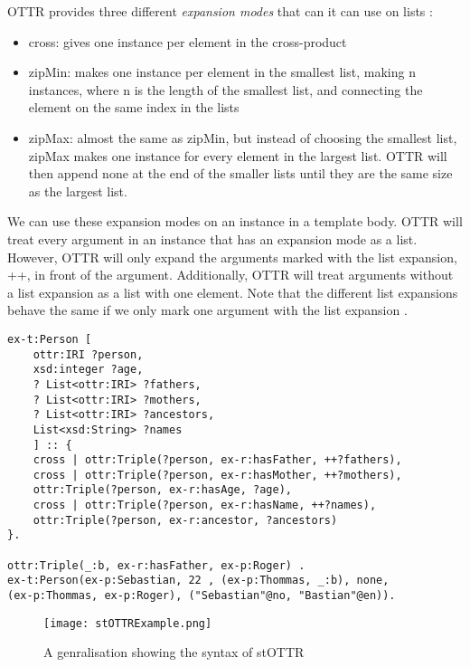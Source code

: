 \para
OTTR provides three different \emph{expansion modes} that can it can use on lists \autocite[8]{SLKK_OTTR_2021}: 
\begin{itemize}
    \item cross: gives one instance per element in the cross-product
    \item zipMin: makes one instance per element in the smallest list, making n instances, where n is the length of the smallest list, and connecting the element on the same index in the lists
    \item zipMax: almost the same as zipMin, but instead of choosing the smallest list, zipMax makes one instance for every element in the largest list. OTTR will then append none at the end of the smaller lists until they are the same size as the largest list. 
\end{itemize}
We can use these expansion modes on an instance in a template body. OTTR will treat every argument in an instance that has an expansion mode as a list. However, OTTR will only expand the arguments marked with the list expansion, ++, in front of the argument. Additionally, OTTR will treat arguments without a list expansion as a list with one element. Note that the different list expansions behave the same if we only mark one argument with the list expansion \autocite[480]{SLKF_OTTR_2018}. 

\begin{lstlisting}[frame=single]
ex-t:Person [
    ottr:IRI ?person,
    xsd:integer ?age,
    ? List<ottr:IRI> ?fathers,
    ? List<ottr:IRI> ?mothers,
    ? List<ottr:IRI> ?ancestors,
    List<xsd:String> ?names
    ] :: {
    cross | ottr:Triple(?person, ex-r:hasFather, ++?fathers),
    cross | ottr:Triple(?person, ex-r:hasMother, ++?mothers),
    ottr:Triple(?person, ex-r:hasAge, ?age),
    cross | ottr:Triple(?person, ex-r:hasName, ++?names),
    ottr:Triple(?person, ex-r:ancestor, ?ancestors)
}.

ottr:Triple(_:b, ex-r:hasFather, ex-p:Roger) .
ex-t:Person(ex-p:Sebastian, 22 , (ex-p:Thommas, _:b), none, 
(ex-p:Thommas, ex-p:Roger), ("Sebastian"@no, "Bastian"@en)).
\end{lstlisting}

\begin{figure}
    \centering
    \texttt{[image: stOTTRExample.png]}
    \caption{A genralisation showing the syntax of stOTTR}
    \label{fig:stOTTERGenralisation}
\end{figure}

